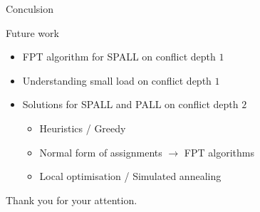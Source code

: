 \documentclass[10 pt]{beamer}
\begin{document}
\begin{section}{Conculsion}
\begin{frame}{Future work}
\begin{itemize}
\vspace{1cm}
\item FPT algorithm for SPALL on conflict depth $1$
\vspace{1cm}
\item Understanding small load on conflict depth $1$
\vspace{1cm}
\item Solutions for SPALL and PALL on conflict depth $2$
\begin{itemize}
\item Heuristics / Greedy
\item Normal form of assignments $\rightarrow$ FPT algorithms
\item Local optimisation / Simulated annealing
\end{itemize}


\vspace{1cm}

\end{itemize}
\vspace{0.5cm}



\end{frame}

\begin{frame}
\centering
\huge{Thank you for your attention.}

\end{frame}
\end{section}
\end{document}

